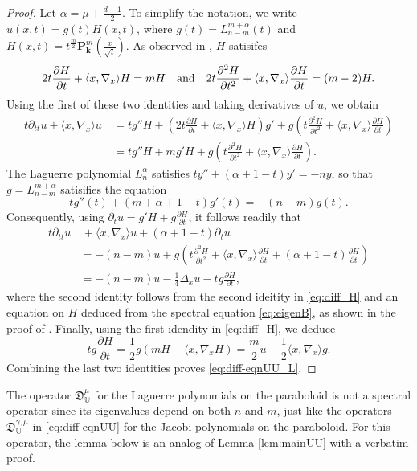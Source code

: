 \documentclass{amsart}
\theoremstyle{remark}
\def\la{{\langle}}
\def\ra{{\rangle}}
\def\fD{{\mathfrak D}}
\def\a{{\alpha}}
\def\g{{\gamma}}
\def\la{{\langle}}
\def\ra{{\rangle}}
\def\kb{{\mathbf k}}
\def\Pb{{\mathbf P}}
\def\UU{{\mathbb U}}
\def\f{\frac}
\begin{document}
\begin{proof}
Let $\a = \mu + \frac{d-1}{2}$. To simplify the notation, we write $u(x,t) = g(t) H(x,t)$, where 
$g(t) = L_{n-m}^{m+\a}(t)$ and $H(x,t) = t^{\f m 2}\Pb_{\kb}^m(\frac{x}{\sqrt{t}})$. As observed in \cite[(4.8) and (4.9)]{X23a},
$H$ satisifes 
\begin{equation} \label{eq:diff_H}
   2 t \frac{\partial H}{\partial t} + \la x, \nabla_x \ra H = m H \quad \hbox{and} \quad
 2 t \frac{\partial^2 H}{\partial t^2} + \la x, \nabla_x \ra \frac{\partial H}{\partial t}  = (m-2) H. 
\end{equation}
Using the first of these two identities and taking derivatives of $u$, we obtain 
\begin{align*}
  t \partial_{tt} u + \la x, \nabla_x \ra u \,& = t g'' H + \left(2t \frac{\partial H}{\partial t} + \la x ,\nabla_x \ra H\right) g' 
    +  g  \left( t \frac{\partial^2 H}{\partial t^2}+\la x, \nabla_x \ra \frac{\partial H}{\partial t}\right) \\
      & =  t g'' H +m g' H 
    +  g  \left( t \frac{\partial^2 H}{\partial t^2}+\la x, \nabla_x \ra \frac{\partial H}{\partial t}\right).
 \end{align*}
The Laguerre polynomial $L_n^\a$ satisfies $t y'' + (\a+1-t) y' = - n y$, so that $g = L_{n-m}^{m+\a}$ satisifies
the equation 
$$
      t g''(t) + (m+\a +1-t)g'(t) = - (n-m) g(t).  
$$
Consequently, using $\partial_t u= g' H + g \frac{\partial H}{\partial t}$, it follows readily that 
\begin{align*}
   t \partial_{tt} u &\, + \la x, \nabla_x \ra u + (\a + 1 -t) \partial_t u  \\
  & = -(n-m) u + g  \left( t \frac{\partial^2 H}{\partial t^2}+\la x, \nabla_x \ra \frac{\partial H}{\partial t}
     + (\a+1-t)\frac{\partial H}{\partial t} \right) \\
  & = -(n-m) u - \frac14 \Delta_x u - t g \frac{\partial H}{\partial t},     
\end{align*}
where the second identity follows from the second ideitity in \eqref{eq:diff_H} and an equation on $H$ 
deduced from the spectral equation \eqref{eq:eigenB}, as shown in the proof of \cite[Prop. 4.2]{X23a}. 
Finally, using the first idendity in \eqref{eq:diff_H}, we deduce
$$
 t g \frac{\partial H}{\partial t} = \f12 g (m H - \la x,\nabla_x H) = \frac{m}2 u - \frac 12 \la x, \nabla_x \ra g.
$$
Combining the last two identities proves \eqref{eq:diff-eqnUU_L}. 
\end{proof}

The operator $\fD_\UU^\mu$ for the Laguerre polynomials on the paraboloid is not a spectral operator
since its eigenvalues depend on both $n$ and $m$, just like the operators $\fD_\UU^{\g,\mu}$ in 
\eqref{eq:diff-eqnUU} for the Jacobi polynomials on the paraboloid. For this operator, the lemma below
is an analog of Lemma \ref{lem:mainUU} with a verbatim proof. 
\end{document}
